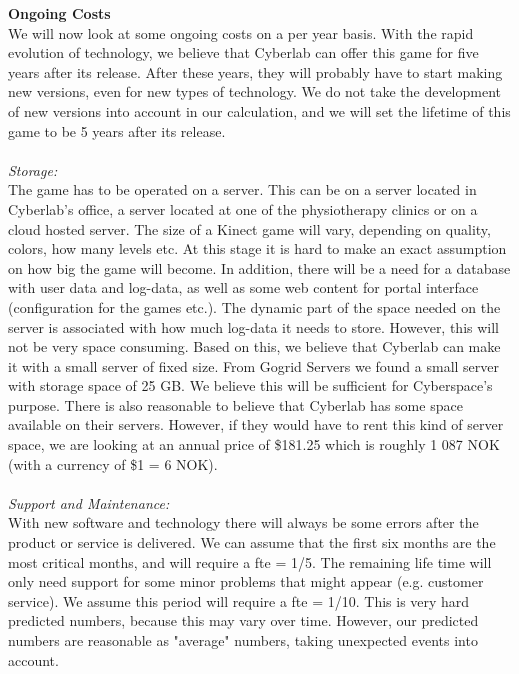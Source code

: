 \newpage
\textbf{Ongoing Costs}\\
We will now look at some ongoing costs on a per year basis. With the rapid evolution of technology, we believe that Cyberlab can offer this game for five years after its release. After these years, they will probably have to start making new versions, even for new types of technology. We do not take the development of new versions into account in our calculation, and we will set the lifetime of this game to be 5 years after its release.\\ \\
\emph{Storage:}\\
The game has to be operated on a server. This can be on a server located in Cyberlab’s office, a server located at one of the physiotherapy clinics or on a cloud hosted server. The size of a Kinect game will vary, depending on quality, colors, how many levels etc. At this stage it is hard to make an exact assumption on how big the game will become. In addition, there will be a need for a database with user data and log-data, as well as some web content for portal interface (configuration for the games etc.). The dynamic part of the space needed on the server is associated with how much log-data it needs to store. However, this will not be very space consuming. Based on this, we believe that Cyberlab can make it with a small server of fixed size. From Gogrid Servers \cite{priceserver} we found a small server with storage space of 25 GB. We believe this will be sufficient for Cyberspace's purpose. There is also reasonable to believe that Cyberlab has some space available on their servers. However, if they would have to rent this kind of server space, we are looking at an annual price of \$181.25 which is roughly 1 087 NOK (with a currency of \$1 = 6 NOK).\\ \\
\emph{Support and Maintenance:}\\
With new software and technology there will always be some errors after the product or service is delivered. We can assume that the first six months are the most critical months, and will require a \ac{fte} = 1/5. The remaining life time will only need support for some minor problems that might appear (e.g. customer service). We assume this period will require a \ac{fte} = 1/10. This is very hard predicted numbers, because this may vary over time. However, our predicted numbers are reasonable as "average" numbers, taking unexpected events into account.  \\ \\
